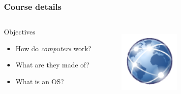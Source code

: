   \begin{frame}
    \frametitle{Course details}
    \begin{columns}
        \begin{block}{Objectives}
          \begin{itemize}
            \item How do \emph{computers} work?
            \item What are they made of?
            \item What is an OS?
          \end{itemize}
        \end{block}
        \begin{figure}[t]
          \centering
          \includegraphics[height=3cm]{./imgs/ntwks.pdf}
          \label{fig:ntwks}
        \end{figure}
    \end{columns}
  \end{frame}

